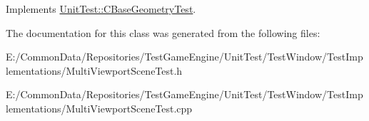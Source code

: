 Implements \mbox{\hyperlink{class_unit_test_1_1_c_base_geometry_test_afe9560d667ef457f7a203453c10593fd}{Unit\+Test\+::\+C\+Base\+Geometry\+Test}}.



The documentation for this class was generated from the following files\+:\begin{DoxyCompactItemize}
\item 
E\+:/\+Common\+Data/\+Repositories/\+Test\+Game\+Engine/\+Unit\+Test/\+Test\+Window/\+Test\+Implementations/Multi\+Viewport\+Scene\+Test.\+h\item 
E\+:/\+Common\+Data/\+Repositories/\+Test\+Game\+Engine/\+Unit\+Test/\+Test\+Window/\+Test\+Implementations/Multi\+Viewport\+Scene\+Test.\+cpp\end{DoxyCompactItemize}
